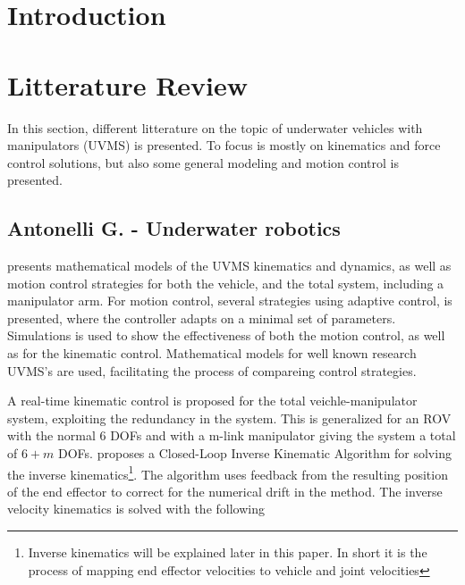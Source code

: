 \section{Introduction}

\clearpage
\section{Litterature Review}

In this section, different litterature on the topic of underwater vehicles with manipulators (UVMS) is presented. To focus is mostly on kinematics and force control solutions, but also some general modeling and motion control is presented.  
\\

\subsection{Antonelli G. - Underwater robotics}

\cite{antonelli1} presents mathematical models of the UVMS kinematics and dynamics, as well as motion control strategies for both the vehicle, and the total system, including a manipulator arm. For motion control, several strategies using adaptive control, is presented, where the controller adapts on a minimal set of parameters. Simulations is used to show the effectiveness of both the motion control, as well as for the kinematic control. Mathematical models for well known research UVMS's are used, facilitating the process of compareing control strategies. 

A real-time kinematic control is proposed for the total veichle-manipulator system, exploiting the redundancy in the system. This is generalized for an ROV with the normal 6 DOFs and with a m-link manipulator giving the system a total of $6+m$ DOFs. 
\cite{antonelli1} proposes a Closed-Loop Inverse Kinematic Algorithm for solving the inverse kinematics\footnote{Inverse kinematics will be explained later in this paper. In short it is the process of mapping end effector velocities to vehicle and joint velocities}. The algorithm uses feedback from the resulting position of the end effector to correct for the numerical drift in the method. The inverse velocity kinematics is solved with the following


